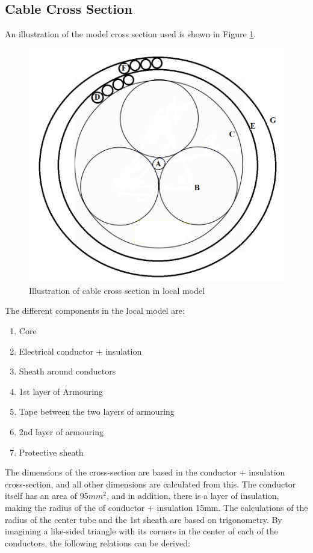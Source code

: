 \subsection{Cable Cross Section}
 An illustration of the model cross section used is shown in Figure \ref{fig:cross2}. 

\begin{figure}[H]
\centering
\includegraphics[scale=0.6]{figures/cross2}
\caption[$\; \:$Cable cross section in local model]{Illustration of cable cross section in local model  }
 \label{fig:cross2}
\end{figure}

\noindent The different components in the local model are:
\begin{enumerate}[label=\Alph*]
\item Core
\item Electrical conductor + insulation
\item Sheath around conductors
\item 1st layer of Armouring 
\item Tape between the two layers of armouring
\item 2nd layer of armouring
\item Protective sheath
\end{enumerate}

\noindent The dimensions of the cross-section are based in the conductor + insulation cross-section, and all other dimensions are calculated from this. The conductor itself has an area of 95$mm^2$, and in addition, there is a layer of insulation, making the radius of the of conductor + insulation 15mm.  The calculations of the radius of the center tube and the 1st sheath are based on trigonometry. By imagining a like-sided triangle with its corners in the center of each of the conductors, the following relations can be derived: 


